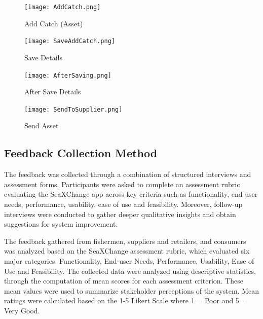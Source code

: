 \begin{figure}[H]
	\centering
	\texttt{[image: AddCatch.png]}
	\caption{Add Catch (Asset)}
	\label{fig:add_catch}
\end{figure}

\begin{figure}[H]
	\centering
	\texttt{[image: SaveAddCatch.png]}
	\caption{Save Details}
	\label{fig:save_details}
\end{figure}

\begin{figure}[H]
	\centering
	\texttt{[image: AfterSaving.png]}
	\caption{After Save Details}
	\label{fig:after_save}
\end{figure}

\begin{figure}[H]
	\centering
	\texttt{[image: SendToSupplier.png]}
	\caption{Send Asset}
	\label{fig:sendto_supplier}
\end{figure}

\subsection{Feedback Collection Method}
The feedback was collected through a combination of structured interviews and assessment forms. Participants were asked to complete an assessment rubric evaluating the SeaXChange app across key criteria such as functionality, end-user needs, performance, usability, ease of use and feasibility. Moreover, follow-up interviews were conducted to gather deeper qualitative insights and obtain suggestions for system improvement.

The feedback gathered from fishermen, suppliers and retailers, and consumers was analyzed based on the SeaXChange assessment rubric, which evaluated six major categories: Functionality, End-user Needs, Performance, Usability, Ease of Use and Feasibility. The collected data were analyzed using descriptive statistics, through the computation of mean scores for each assessment criterion. These mean values were used to summarize stakeholder perceptions of the system. Mean ratings were calculated based on the 1-5 Likert Scale where 1 = Poor and 5 = Very Good.

